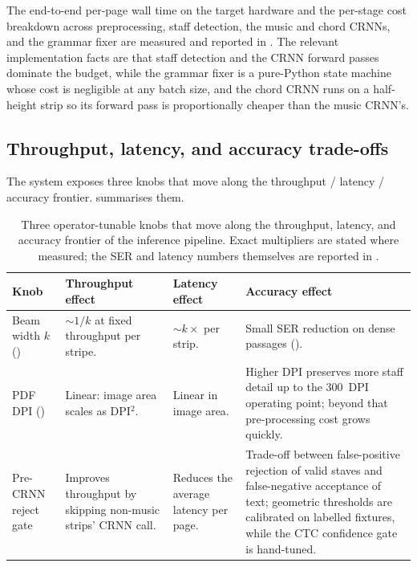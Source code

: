The end-to-end per-page wall time on the target hardware and the
per-stage cost breakdown across preprocessing, staff detection, the
music and chord CRNNs, and the grammar fixer are measured and reported
in . The relevant implementation facts are that staff
detection and the CRNN forward passes dominate the budget, while the
grammar fixer is a pure-Python state machine whose cost is negligible
at any batch size, and the chord CRNN runs on a half-height strip so
its forward pass is proportionally cheaper than the music CRNN's.

\subsection{Throughput, latency, and accuracy trade-offs}

The system exposes three knobs that move along the throughput /
latency / accuracy frontier.
 summarises them.

\begin{table}[ht]
\centering
\small
\setlength{\tabcolsep}{5pt}
\renewcommand{\arraystretch}{1.30}
\begin{tabularx}{\textwidth}{@{} l L L L @{}}
\toprule
\textbf{Knob} & \textbf{Throughput effect} & \textbf{Latency effect} & \textbf{Accuracy effect} \\
\midrule
Beam width $k$ () & $\sim 1/k$ at fixed throughput per stripe. & $\sim k\times$ per strip. & Small SER reduction on dense passages (). \\ \tfgrowsep
PDF DPI () & Linear: image area scales as DPI$^2$. & Linear in image area. & Higher DPI preserves more staff detail up to the \SI{300}{DPI} operating point; beyond that pre-processing cost grows quickly. \\ \tfgrowsep
Pre-CRNN reject gate & Improves throughput by skipping non-music strips' CRNN call. & Reduces the average latency per page. & Trade-off between false-positive rejection of valid staves and false-negative acceptance of text; geometric thresholds are calibrated on labelled fixtures, while the CTC confidence gate is hand-tuned. \\
\bottomrule
\end{tabularx}
\caption{Three operator-tunable knobs that move along the throughput,
latency, and accuracy frontier of the inference pipeline.
Exact multipliers are stated where measured; the SER and latency
numbers themselves are reported in .}
\label{tab:perf-tradeoffs}
\end{table}

